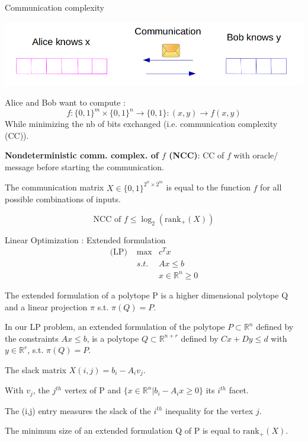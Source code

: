 \begin{frame}{Communication complexity}
\begin{center}
\includegraphics[scale=0.2]{../images/communication.png}
\end{center}
\small
Alice and Bob want to compute :
\[f:\{0,1\}^m \times \{0,1\}^n \rightarrow \{0,1\} : (x,y) \rightarrow f(x,y)
\]
While minimizing the nb of bits exchanged (i.e. communication complexity (CC)).


\textbf{Nondeterministic comm. complex. of $f$ (NCC)}: CC of $f$ with oracle/ message before starting the communication.


The communication matrix $X \in \{0,1\}^{2^n\times 2^m}$ is equal to the function $f$ for all possible combinations of inputs.

\begin{thm}[Yannakis]
\[\text{NCC of } f \leq \log_2(\text{rank}_+(X))
\]
\end{thm}
\end{frame}

\begin{frame}{Linear Optimization : Extended formulation}
\begin{align*}
\text{(LP) } & \max & c^T x\\
 &s.t. & Ax\leq b\\
 & & x \in \mathbb{R}^n \geq 0
\end{align*}
\begin{defn}
The extended formulation of a polytope P is a higher dimensional polytope Q and a linear projection $\pi$ s.t. $\pi(Q) = P$.
\end{defn}
In our LP problem, an extended formulation of the polytope $P \subset \mathbb{R}^n$ defined by the constraints $Ax\leq b$, is a polytope $Q\subset \mathbb{R}^{n+r}$ defined by $Cx+Dy \leq d$ with $y\in \mathbb{R}^r$, s.t. $\pi(Q) = P$.

\end{frame}

\begin{frame}
The slack matrix $X(i,j) = b_i-A_iv_j$.

With $v_j$, the $j^{th}$ vertex of P and $\{x\in \mathbb{R}^n | b_i-A_ix\geq 0\}$ its $i^{th}$ facet.

The (i,j) entry measures the slack of the $i^{th}$ inequality for the vertex $j$. 
\begin{thm}[Yannakis]
The minimum size of an extended formulation Q of P is equal to $\text{rank}_+(X)$.
\end{thm}
\end{frame}